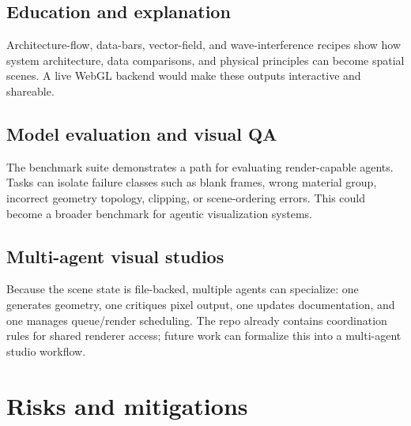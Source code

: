 \documentclass[11pt,a4paper]{article}
\begin{document}
\subsection{Education and explanation}

Architecture-flow, data-bars, vector-field, and wave-interference recipes show how system architecture, data comparisons, and physical principles can become spatial scenes. A live WebGL backend would make these outputs interactive and shareable.

\subsection{Model evaluation and visual QA}

The benchmark suite demonstrates a path for evaluating render-capable agents. Tasks can isolate failure classes such as blank frames, wrong material group, incorrect geometry topology, clipping, or scene-ordering errors. This could become a broader benchmark for agentic visualization systems.

\subsection{Multi-agent visual studios}

Because the scene state is file-backed, multiple agents can specialize: one generates geometry, one critiques pixel output, one updates documentation, and one manages queue/render scheduling. The repo already contains coordination rules for shared renderer access; future work can formalize this into a multi-agent studio workflow.

\section{Risks and mitigations}
\end{document}
